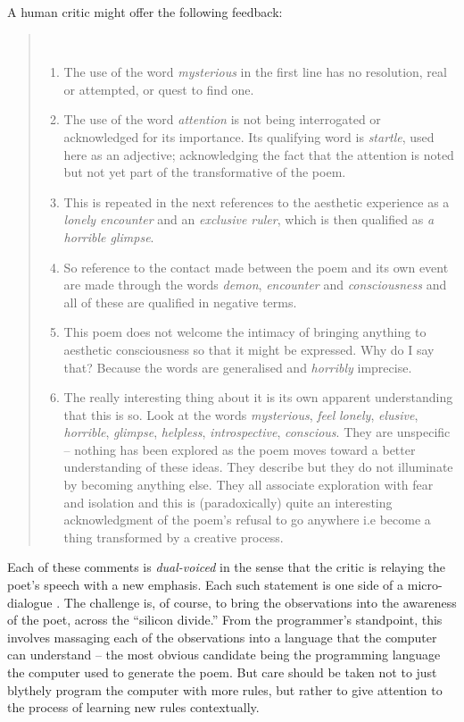 A human critic might offer the following feedback:

\begin{quotation}
~\vspace{-1\baselineskip}
\begin{enumerate}
\item The use of the word \emph{mysterious} in the first line has no
  resolution, real or attempted, or quest to find one.
%
\item The use of the word \emph{attention} is not being interrogated
  or acknowledged for its importance.  Its qualifying word is
  \emph{startle}, used here as an adjective; acknowledging the fact
  that the attention is noted but not yet part of the transformative
  of the poem.
%
\item This is repeated in the next references to the aesthetic
  experience as a \emph{lonely encounter} and an \emph{exclusive
    ruler}, which is then qualified as \emph{a horrible glimpse}.
%
\item So reference to the contact made between the poem and its own
  event are made through the words \emph{demon}, \emph{encounter} and
  \emph{consciousness} and all of these are qualified in negative
  terms.
%
\item This poem does not welcome the intimacy of bringing anything to
  aesthetic consciousness so that it might be expressed. Why do I say
  that? Because the words are generalised and \emph{horribly}
  imprecise.
%
\item The really interesting thing about it is its own apparent
  understanding that this is so.  Look at the words \emph{mysterious},
  \emph{feel} \emph{lonely}, \emph{elusive}, \emph{horrible},
  \emph{glimpse}, \emph{helpless}, \emph{introspective},
  \emph{conscious}. They are unspecific -- nothing has been explored
  as the poem moves toward a better understanding of these ideas. They
  describe but they do not illuminate by becoming anything else. They
  all associate exploration with fear and isolation and this is
  (paradoxically) quite an interesting acknowledgment of the poem’s
  refusal to go anywhere i.e become a thing transformed by a creative
  process.
\end{enumerate}
\end{quotation}

Each of these comments is \emph{dual-voiced} in the sense that the
critic is relaying the poet's speech with a new emphasis.  Each such
statement is one side of a micro-dialogue
\cite[p. 73]{bakhtin1984problems}.  The challenge is, of course, to
bring the observations into the awareness of the poet, across the
``silicon divide.''  From the programmer's standpoint, this involves
massaging each of the observations into a language that the computer
can understand -- the most obvious candidate being the programming
language the computer used to generate the poem.  But care should be
taken not to just blythely program the computer with more rules, but
rather to give attention to the process of learning new rules
contextually.

